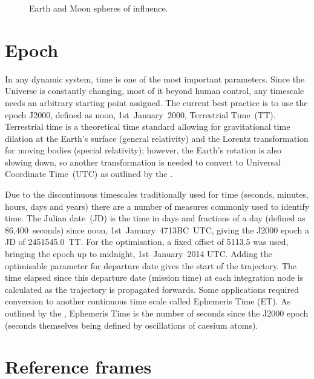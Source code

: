 \begin{figure} [ht]
\centering
\def\svgwidth{\figurewidth}

\caption{Earth and Moon spheres of influence.} \label{fig:Spheres-of-Influence}
\end{figure}








\section{Epoch} \label{sec:Epoch}

In any dynamic system, time is one of the most important parameters. Since the Universe is constantly changing, most of it beyond human control, any timescale needs an arbitrary starting point assigned. The current best practice is to use the epoch J2000, defined as noon, 1st~January~2000, Terrestrial Time~(TT). Terrestrial time is a theoretical time standard allowing for gravitational time dilation at the Earth's surface (general relativity) and the Lorentz transformation for moving bodies (special relativity); however, the Earth's rotation is also slowing down, so another transformation is needed to convert to Universal Coordinate Time~(UTC) as outlined by the \textcite[USNO, ][]{web_TimeServiceDept.2008}.

Due to the discontinuous timescales traditionally used for time (seconds, minutes, hours, days and years) there are a number of measures commonly used to identify time. The Julian date~(JD) is the time in days and fractions of a day (defined as 86,400~seconds) since noon, 1st~January~4713BC~UTC, giving the J2000 epoch a JD of 2451545.0~TT. For the optimisation, a fixed offset of 5113.5 was used, bringing the epoch up to midnight, 1st~January~2014 UTC. Adding the optimisable parameter for departure date gives the start of the trajectory. The time elapsed since this departure date (mission time) at each integration node is calculated as the trajectory is propagated forwards. Some applications required conversion to another continuous time scale called Ephemeris Time (ET). As outlined by the \textcite{NAIF2010}, Ephemeris Time is the number of seconds since the J2000 epoch (seconds themselves being defined by oscillations of caesium atoms).




\section{Reference frames} \label{sec:Reference-frames}


